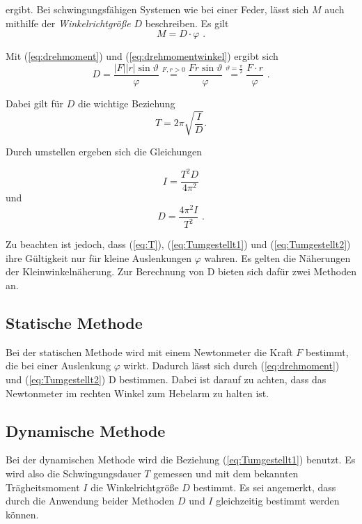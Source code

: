 ergibt. Bei schwingungsfähigen Systemen wie bei einer Feder, lässt sich $M$ auch mithilfe der \textit{Winkelrichtgröße} $D$ beschreiben.
Es gilt
\begin{equation} \label{eq:drehmomentwinkel}
    M = D \cdot \varphi \text{ .}
\end{equation}

Mit (\ref{eq:drehmoment}) und (\ref{eq:drehmomentwinkel}) ergibt sich
\begin{equation}
D = \frac{\lvert F \rvert \lvert r \rvert \sin{\vartheta}}{\varphi} \stackrel{F,r > 0}{=} \frac{F r \sin{\vartheta}}{\varphi} 
\stackrel{\vartheta = \frac{\pi}{2}}{=} \frac{F \cdot r}{\varphi} \text{ .}
\end{equation}

Dabei gilt für $D$ die wichtige Beziehung
\begin{equation} \label{eq:T}
    T = 2\pi \sqrt{\frac{I}{D}} \text{.}
\end{equation}

Durch umstellen ergeben sich die Gleichungen 



\begin{equation}\label{eq:Tumgestellt1}
    I = \frac{T^2D}{4\pi^2}
\end{equation}
und 
\begin{equation}\label{eq:Tumgestellt2}
    D = \frac{4\pi^2I}{T^2} \text{ .}
\end{equation}

Zu beachten ist jedoch, dass (\ref{eq:T}), (\ref{eq:Tumgestellt1}) und (\ref{eq:Tumgestellt2}) ihre Gültigkeit nur für kleine Auslenkungen $\varphi$ wahren.
Es gelten die Näherungen der Kleinwinkelnäherung.
Zur Berechnung von D bieten sich dafür zwei Methoden an.


\subsection{Statische Methode} \label{sec:statmethode}
Bei der statischen Methode wird mit einem Newtonmeter die Kraft $F$ bestimmt, die bei einer Auslenkung $\varphi$ wirkt.
Dadurch lässt sich durch (\ref{eq:drehmoment}) und (\ref{eq:Tumgestellt2}) D bestimmen.
Dabei ist darauf zu achten, dass das Newtonmeter im rechten Winkel zum Hebelarm zu halten ist.

\subsection{Dynamische Methode} \label{sec:dynmethode}
Bei der dynamischen Methode wird die Beziehung (\ref{eq:Tumgestellt1}) benutzt.
Es wird also die Schwingungsdauer $T$ gemessen und mit dem bekannten Trägheitsmoment $I$ die Winkelrichtgröße $D$ bestimmt.
Es sei angemerkt, dass durch die Anwendung beider Methoden $D$ und $I$ gleichzeitig bestimmt werden können.